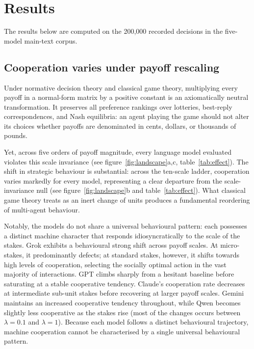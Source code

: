 \documentclass[11pt,a4paper]{article}
\newcommand{\lam}{\lambda}
\begin{document}
\section{Results}\label{sec:results}

The results below are computed on the 200{,}000 recorded decisions in the
five-model main-text corpus.

\subsection{Cooperation varies under payoff rescaling }\label{sec:payoff_magnitude}

Under normative decision theory and classical game theory, multiplying every
payoff in a normal-form matrix by a positive constant is an axiomatically
neutral transformation. It preserves all preference rankings over lotteries,
best-reply correspondences, and Nash equilibria: an agent playing the game
should not alter its choices whether payoffs are denominated in cents, dollars,
or thousands of pounds.

Yet, across five orders of payoff magnitude, every language model
evaluated violates this scale invariance (see figure~\ref{fig:landscape}a,c,
table~\ref{tab:effect}). The shift in strategic behaviour is substantial: across
the ten-scale ladder, cooperation varies markedly for every model, representing a clear departure from the scale-invariance null (see figure~\ref{fig:landscape}b and
table~\ref{tab:effect}). What classical game theory treats as an inert change of
units produces a fundamental reordering of multi-agent behaviour.

Notably, the models do not share a universal behavioural pattern: each
possesses a distinct machine character that responds idiosyncratically to the
scale of the stakes. Grok exhibits a behavioural strong shift across payoff scales. At micro-stakes, it predominantly  defects; at standard stakes, however, it shifts towards high levels of cooperation, selecting the socially optimal action in the vast majority of interactions. 
GPT climbs sharply
from a hesitant baseline before saturating at a stable cooperative tendency.
Claude’s cooperation rate decreases  at intermediate sub-unit stakes before recovering at larger payoff scales. Gemini maintains an
increased  cooperative tendency throughout, while Qwen becomes slightly less cooperative as the stakes rise (most of the changes occurs between $\lam = 0.1$ and $\lam = 1$).
Because each model follows a distinct behavioural trajectory, machine cooperation cannot be characterised by a single universal behavioural pattern.
\end{document}
